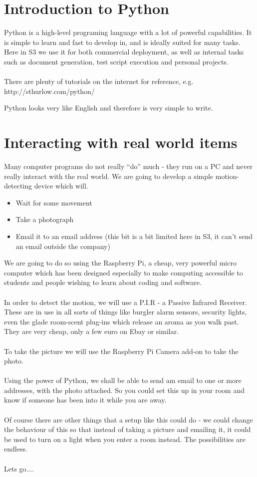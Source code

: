 \documentclass[a4paper]{article}
\begin{document}
\tableofcontents
\newpage
\section {Introduction to Python}
Python is a high-level programing language with a lot of powerful capabilities. 
It is simple to learn and fast to develop in, and is ideally suited for many tasks.
Here in S3 we use it for both commercial deployment, as well as internal tasks such as document generation, test script execution and personal projects.
\\
\\
There are plenty of tutorials on the internet for reference, e.g. \\
http://sthurlow.com/python/

Python looks very like English and therefore is very simple to write. 


\newpage\section {Interacting with real world items}
Many computer programs do not really ``do'' much - they run on a PC and never really interact with the real world. 
We are going to develop a simple motion-detecting device which will.

\begin{itemize}
\item Wait for some movement
\item Take a photograph
\item Email it to an email address (this bit is a bit limited here in S3, it can't send an email outside the company)
\end{itemize}

We are going to do so using the Raspberry Pi, a cheap, very powerful micro computer which 
has been designed especially to make computing accessible to students and people wishing 
to learn about coding and software.
\\
\\
In order to detect the motion, we will use a P.I.R - a Passive Infrared Receiver. 
These are in use in all sorts of things like burgler alarm sensors, security lights, 
even the glade room-scent plug-ins which release an aroma as you walk past. They are very cheap, only a few euro on Ebay or similar.
\\
\\
To take the picture we will use the Raspberry Pi Camera add-on to take the photo.
\\
\\
Using the power of Python, we shall be able to send am email to one or more addresses, with the photo attached. 
So you could set this up in your room and know if someone has been into it while you are away.
\\
\\
Of course there are other things that a setup like this could do - we could change the behaviour of this so that 
instead of taking a picture and emailing it, it could be used to turn on a light when you enter a room instead. 
The possibilities are endless.
\\
\\
Lets go....
\end{document}
